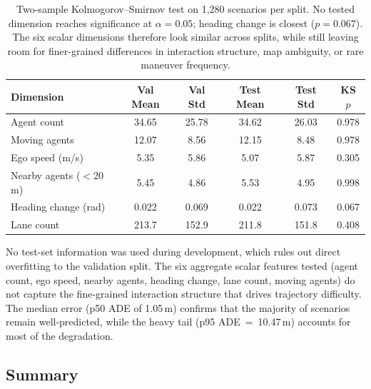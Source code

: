 \begin{table}[t]
\centering
\caption{Validation vs.\ Test Distributional Comparison (1{,}280 Scenarios per Split)}
\label{tab:val_test_distribution}
\setlength{\tabcolsep}{2.5pt}
\begin{tabular}{lccccc}
\toprule
\textbf{Dimension} & \textbf{Val Mean} & \textbf{Val Std} & \textbf{Test Mean} & \textbf{Test Std} & \textbf{KS $p$} \\
\midrule
Agent count & 34.65 & 25.78 & 34.62 & 26.03 & 0.978 \\
Moving agents & 12.07 & 8.56 & 12.15 & 8.48 & 0.978 \\
Ego speed (m/s) & 5.35 & 5.86 & 5.07 & 5.87 & 0.305 \\
Nearby agents ($<$20\,m) & 5.45 & 4.86 & 5.53 & 4.95 & 0.998 \\
Heading change (rad) & 0.022 & 0.069 & 0.022 & 0.073 & 0.067 \\
Lane count & 213.7 & 152.9 & 211.8 & 151.8 & 0.408 \\
\bottomrule
\end{tabular}
\vspace{1mm}
\caption*{\footnotesize Two-sample Kolmogorov--Smirnov test on 1{,}280 scenarios per split.  No tested dimension reaches significance at $\alpha{=}0.05$; heading change is closest ($p{=}0.067$).  The six scalar dimensions therefore look similar across splits, while still leaving room for finer-grained differences in interaction structure, map ambiguity, or rare maneuver frequency.}
\end{table}

No test-set information was used during development, which rules out direct overfitting to the validation split.  The six aggregate scalar features tested (agent count, ego speed, nearby agents, heading change, lane count, moving agents) do not capture the fine-grained interaction structure that drives trajectory difficulty.  The median error (p50 ADE of 1.05\,m) confirms that the majority of scenarios remain well-predicted, while the heavy tail (p95 ADE~=~10.47\,m) accounts for most of the degradation.

\subsection{Summary}
\label{subsec:results_summary}

